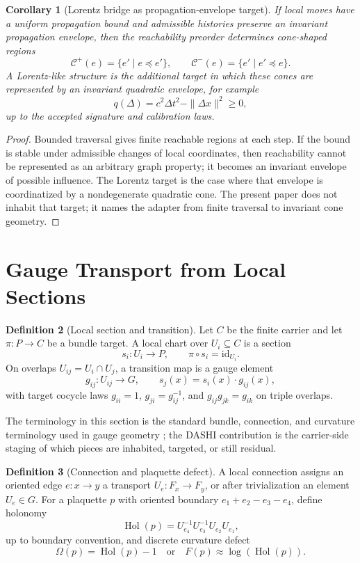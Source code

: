 \documentclass[11pt]{article}
\theoremstyle{definition}
\newtheorem{definition}{Definition}[section]
\theoremstyle{plain}
\newtheorem{corollary}[definition]{Corollary}
\theoremstyle{remark}
\begin{document}
\begin{corollary}[Lorentz bridge as propagation-envelope target]
If local moves have a uniform propagation bound and admissible histories
preserve an invariant propagation envelope, then the reachability preorder
determines cone-shaped regions
\[
\mathcal C^+(e)=\{e'\mid e\preceq e'\},
\qquad
\mathcal C^-(e)=\{e'\mid e'\preceq e\}.
\]
A Lorentz-like structure is the additional target in which these cones are
represented by an invariant quadratic envelope, for example
\[
q(\Delta)=c^2\Delta t^2-\|\Delta x\|^2\ge 0,
\]
up to the accepted signature and calibration laws.
\end{corollary}

\begin{proof}
Bounded traversal gives finite reachable regions at each step. If the bound
is stable under admissible changes of local coordinates, then reachability
cannot be represented as an arbitrary graph property; it becomes an invariant
envelope of possible influence. The Lorentz target is the case where that
envelope is coordinatized by a nondegenerate quadratic cone. The present paper
does not inhabit that target; it names the adapter from finite traversal to
invariant cone geometry.
\end{proof}

\section{Gauge Transport from Local Sections}

\begin{definition}[Local section and transition]
Let \(C\) be the finite carrier and let \(\pi:P\to C\) be a bundle target. A
local chart over \(U_i\subseteq C\) is a section
\[
s_i:U_i\to P,
\qquad
\pi\circ s_i=\mathrm{id}_{U_i}.
\]
On overlaps \(U_{ij}=U_i\cap U_j\), a transition map is a gauge element
\[
g_{ij}:U_{ij}\to G,
\qquad
s_j(x)=s_i(x)\cdot g_{ij}(x),
\]
with target cocycle laws \(g_{ii}=1\), \(g_{ji}=g_{ij}^{-1}\), and
\(g_{ij}g_{jk}=g_{ik}\) on triple overlaps.
\end{definition}

The terminology in this section is the standard bundle, connection, and
curvature terminology used in gauge geometry
\cite{nakahara-2003,baez-muniain-1994,marsh-2016}; the DASHI contribution is
the carrier-side staging of which pieces are inhabited, targeted, or still
residual.

\begin{definition}[Connection and plaquette defect]
A local connection assigns an oriented edge \(e:x\to y\) a transport
\(U_e:F_x\to F_y\), or after trivialization an element \(U_e\in G\). For a
plaquette \(p\) with oriented boundary \(e_1+e_2-e_3-e_4\), define holonomy
\[
\operatorname{Hol}(p)=U_{e_4}^{-1}U_{e_3}^{-1}U_{e_2}U_{e_1},
\]
up to boundary convention, and discrete curvature defect
\[
\Omega(p)=\operatorname{Hol}(p)-1
\quad\text{or}\quad
F(p)\approx\log(\operatorname{Hol}(p)).
\]
\end{definition}
\end{document}
